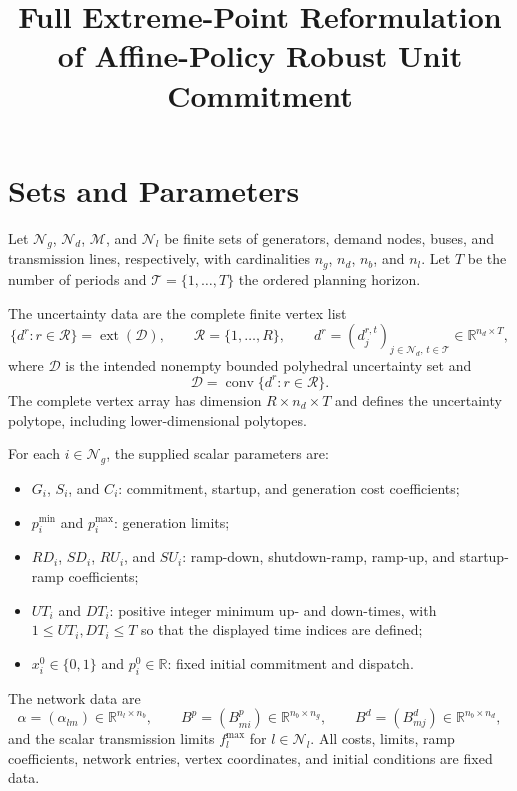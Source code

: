 \documentclass[11pt]{article}
\title{Full Extreme-Point Reformulation of Affine-Policy Robust Unit Commitment}
\author{}
\date{}
\begin{document}
\maketitle

\section{Sets and Parameters}

Let $\mathcal N_g$, $\mathcal N_d$, $\mathcal M$, and $\mathcal N_l$ be finite sets of generators, demand nodes, buses, and transmission lines, respectively, with cardinalities $n_g$, $n_d$, $n_b$, and $n_l$. Let $T$ be the number of periods and $\mathcal T=\{1,\ldots,T\}$ the ordered planning horizon.

The uncertainty data are the complete finite vertex list
\[
\{d^r:r\in\mathcal R\}=\operatorname{ext}(\mathcal D),
\qquad \mathcal R=\{1,\ldots,R\},
\qquad d^r=(d_j^{r,t})_{j\in\mathcal N_d,\,t\in\mathcal T}
\in\mathbb R^{n_d\times T},
\]
where $\mathcal D$ is the intended nonempty bounded polyhedral uncertainty set and
\[
\mathcal D=\operatorname{conv}\{d^r:r\in\mathcal R\}.
\]
The complete vertex array has dimension $R\times n_d\times T$ and defines the uncertainty polytope, including lower-dimensional polytopes.

For each $i\in\mathcal N_g$, the supplied scalar parameters are:
\begin{itemize}
\item $G_i$, $S_i$, and $C_i$: commitment, startup, and generation cost coefficients;
\item $p_i^{\min}$ and $p_i^{\max}$: generation limits;
\item $RD_i$, $SD_i$, $RU_i$, and $SU_i$: ramp-down, shutdown-ramp, ramp-up, and startup-ramp coefficients;
\item $UT_i$ and $DT_i$: positive integer minimum up- and down-times, with $1\le UT_i,DT_i\le T$ so that the displayed time indices are defined;
\item $x_i^0\in\{0,1\}$ and $p_i^0\in\mathbb R$: fixed initial commitment and dispatch.
\end{itemize}
The network data are
\[
\alpha=(\alpha_{lm})\in\mathbb R^{n_l\times n_b},
\qquad B^p=(B^p_{mi})\in\mathbb R^{n_b\times n_g},
\qquad B^d=(B^d_{mj})\in\mathbb R^{n_b\times n_d},
\]
and the scalar transmission limits $f_l^{\max}$ for $l\in\mathcal N_l$. All costs, limits, ramp coefficients, network entries, vertex coordinates, and initial conditions are fixed data.
\end{document}

